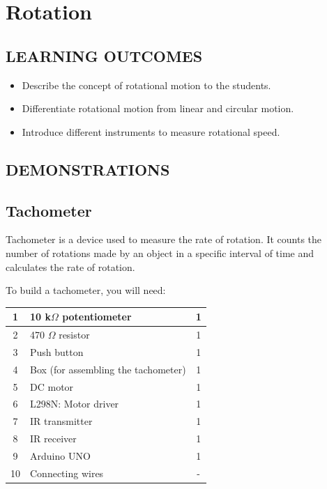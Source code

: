 \chapter{Rotation}

\section*{LEARNING OUTCOMES}
{
\begin{center}
{%
    \parbox{0.95\textwidth}
    {%
        \small
        {
        \begin{itemize}
            \item Describe the concept of rotational motion to the students.
            \item Differentiate rotational motion from linear and circular motion.
            \item Introduce different instruments to measure rotational speed.
        \end{itemize}
        }
    }%
}
\end{center}
}

\section*{DEMONSTRATIONS}
\section*{Tachometer}
Tachometer is a device used to measure the rate of rotation. It counts the number of rotations made by an object in a specific interval of time and calculates the rate of rotation.

To build a tachometer, you will need:
\begin{table}[H]
    \centering
    \begin{tabular}{|c|l|c|}\hline
    1   &   10 k$\Omega$ potentiometer  &   1\\\hline
    2   &   470 $\Omega$ resistor       &   1\\\hline
    3   &   Push button                 &   1\\\hline
    4   &   Box (for assembling the tachometer)            &   1\\\hline
    5   &   DC motor                    &   1\\\hline
    6   &   L298N: Motor driver         &   1\\\hline
    7   &   IR transmitter              &   1\\\hline
    8   &   IR receiver                 &   1\\\hline 
    9   &   Arduino UNO                 &   1\\\hline
    10  &   Connecting wires            &   -\\\hline
    \end{tabular}
\end{table}

